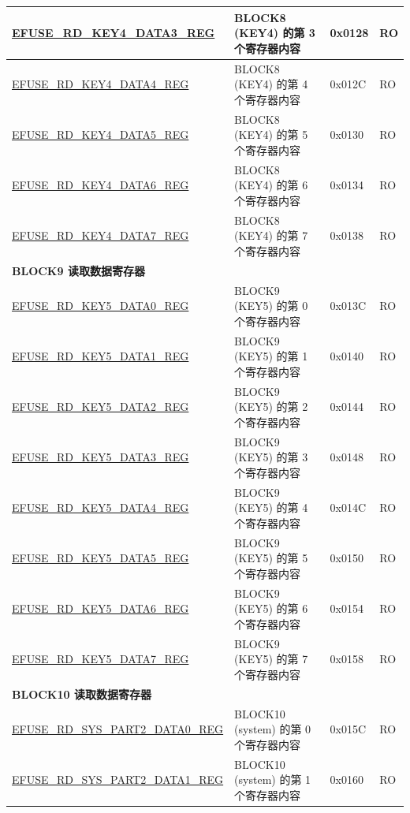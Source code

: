 \begin{longtable}{ | p{7cm} | p{7.2cm} | p{1.3cm} | p{1cm} | }
\hyperref[regdesc:EFUSERDKEY4DATANREG]{EFUSE\_RD\_KEY4\_DATA3\_REG} & BLOCK8 (KEY4) 的第 3 个寄存器内容 & 0x0128 & RO \\ \hline
\hyperref[regdesc:EFUSERDKEY4DATANREG]{EFUSE\_RD\_KEY4\_DATA4\_REG} & BLOCK8 (KEY4) 的第 4 个寄存器内容 & 0x012C & RO \\ \hline
\hyperref[regdesc:EFUSERDKEY4DATANREG]{EFUSE\_RD\_KEY4\_DATA5\_REG} & BLOCK8 (KEY4) 的第 5 个寄存器内容 & 0x0130 & RO \\ \hline
\hyperref[regdesc:EFUSERDKEY4DATANREG]{EFUSE\_RD\_KEY4\_DATA6\_REG} & BLOCK8 (KEY4) 的第 6 个寄存器内容 & 0x0134 & RO \\ \hline
\hyperref[regdesc:EFUSERDKEY4DATANREG]{EFUSE\_RD\_KEY4\_DATA7\_REG} & BLOCK8 (KEY4) 的第 7 个寄存器内容 & 0x0138 & RO \\ \hline
\multicolumn{4}{|l|}{\textbf{BLOCK9 读取数据寄存器}} \\ \hline
\hyperref[regdesc:EFUSERDKEY5DATAMREG]{EFUSE\_RD\_KEY5\_DATA0\_REG} & BLOCK9 (KEY5) 的第 0 个寄存器内容 & 0x013C & RO \\ \hline
\hyperref[regdesc:EFUSERDKEY5DATAMREG]{EFUSE\_RD\_KEY5\_DATA1\_REG} & BLOCK9 (KEY5) 的第 1 个寄存器内容 & 0x0140 & RO \\ \hline
\hyperref[regdesc:EFUSERDKEY5DATAMREG]{EFUSE\_RD\_KEY5\_DATA2\_REG} & BLOCK9 (KEY5) 的第 2 个寄存器内容 & 0x0144 & RO \\ \hline
\hyperref[regdesc:EFUSERDKEY5DATAMREG]{EFUSE\_RD\_KEY5\_DATA3\_REG} & BLOCK9 (KEY5) 的第 3 个寄存器内容 & 0x0148 & RO \\ \hline
\hyperref[regdesc:EFUSERDKEY5DATAMREG]{EFUSE\_RD\_KEY5\_DATA4\_REG} & BLOCK9 (KEY5) 的第 4 个寄存器内容 & 0x014C & RO \\ \hline
\hyperref[regdesc:EFUSERDKEY5DATAMREG]{EFUSE\_RD\_KEY5\_DATA5\_REG} & BLOCK9 (KEY5) 的第 5 个寄存器内容 & 0x0150 & RO \\ \hline
\hyperref[regdesc:EFUSERDKEY5DATAMREG]{EFUSE\_RD\_KEY5\_DATA6\_REG} & BLOCK9 (KEY5) 的第 6 个寄存器内容 & 0x0154 & RO \\ \hline
\hyperref[regdesc:EFUSERDKEY5DATAMREG]{EFUSE\_RD\_KEY5\_DATA7\_REG} & BLOCK9 (KEY5) 的第 7 个寄存器内容 & 0x0158 & RO \\ \hline
\multicolumn{4}{|l|}{\textbf{BLOCK10 读取数据寄存器}} \\ \hline
\hyperref[regdesc:EFUSERDSYSPART2DATANREG]{EFUSE\_RD\_SYS\_PART2\_DATA0\_REG} & BLOCK10 (system) 的第 0 个寄存器内容 & 0x015C & RO \\ \hline
\hyperref[regdesc:EFUSERDSYSPART2DATANREG]{EFUSE\_RD\_SYS\_PART2\_DATA1\_REG} & BLOCK10 (system) 的第 1 个寄存器内容 & 0x0160 & RO \\ \hline

\end{longtable}
